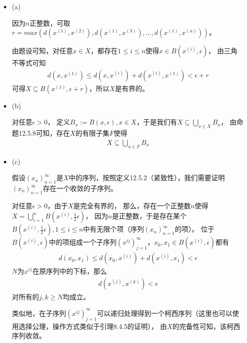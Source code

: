 \documentclass{article}
\begin{document}
\begin{itemize}
  \item (a)

        因为$n$正整数，可取$r = max(d(x^{(1)}, x^{(2)}), d(x^{(1)}, x^{(3)}), ..., d(x^{(1)}, x^{(n)}))$。

        由题设可知，对任意$x \in X$，都存在$1 \leq i \leq n$使得$x \in B(x^{(i)}, \epsilon)$，
        由三角不等式可知
        \begin{align*}
          d(x, x^{(1)}) \leq d(x, x^{(i)}) + d(x^{(i)}, x^{(1)}) < \epsilon + r
        \end{align*}
        可得$X \subseteq B(x^{(1)}, \epsilon + r)$，所以$X$是有界的。

  \item (b)

        对任意$\epsilon > 0$， 定义$B_x := B(x, \epsilon), x \in X$，于是我们有$X \subseteq \bigcup\limits_{x \in X} B_x$，
        由命题12.5.8可知，存在$X$的有限子集$F$使得
        \begin{align*}
          X \subseteq \bigcup\limits_{x \in F} B_x
        \end{align*}

  \item (c)

        假设$(x_n)_{n = 1}^\infty$是$X$中的序列，按照定义12.5.2（紧致性），我们需要证明$(x_n)_{n = 1}^\infty$存在一个收敛的子序列。

        对任意$\epsilon > 0$，由于$X$是完全有界的，
        那么，存在一个正整数$n$使得$X = \bigcup\limits_{i = 1}^n B(x^{(i)}, \frac{1}{2}\epsilon)$，
        因为$n$是正整数，于是存在某个$B(x^{(i)}, \frac{1}{2}\epsilon), 1 \leq i \leq n$中有无限个项（序列$(x_n)_{n = 1}^\infty$的项）。
        位于$B(x^{(i)}, \epsilon)$中的项组成一个子序列$(x^{ij})_{j=1}^\infty$，$x_0, x_1 \in B(x^{(i)}, \epsilon)$都有
        \begin{align*}
          d(x_0, x_1) \leq d(x_0, x^{(i)}) + d(x^{(i)}, x_1) < \epsilon
        \end{align*}
        $N$为$x^{i1}$在原序列中的下标，那么
        \begin{align*}
          d(x^{(j)}, x^{(k)}) < \epsilon
        \end{align*}
        对所有的$j,k \geq N$均成立。

        类似地，在子序列$(x^{ij})_{j=1}^\infty$可以递归处理得到一个柯西序列（这里也可以使用选择公理，操作方式类似于引理8.4.5的证明），
        由$X$的完备性可知，该柯西序列收敛。

\end{itemize}
\end{document}
